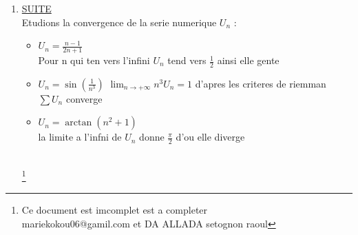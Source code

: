 \documentclass[a4paper,12pt]{article}
\begin{document}
\begin{enumerate}
\begin{itemize}
 		\end{itemize}\\ 
 		\item \underline{SUITE}\\ Etudions la convergence de la serie numerique $U_n$ : 
 		  \begin{itemize}
 		  	\item$ U_n=\frac{n-1}{2n + 1}$ \\ Pour n qui ten vers l'infini  $U_n$ tend vers $\frac{1}{2}$ ainsi elle \cdots    gente 
 		  	\item $U_n= \sin(\frac{1}{n^3})$  $\lim_{n\to+\infty} n^3U_n=1$ d'apres les criteres de riemman  $\sum U_n$ converge  \\ \item $U_n=\arctan(n^2 + 1)$ \\ la limite a l'infni de $U_n$ donne $\frac{\pi}{2}$ d'ou elle diverge \\            
 		  \end{itemize} \\  \footnote{Ce document est imcomplet est a completer       \\ mariekokou06@gamil.com    et DA ALLADA setognon raoul}
 		     
	\end{enumerate}
	
	
	
	
	
	
	
\end{document}
